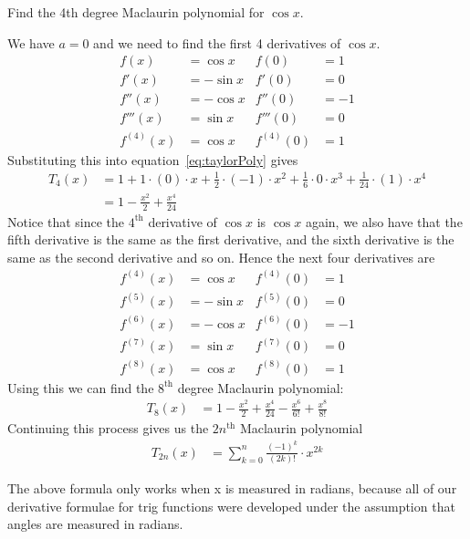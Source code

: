 \begin{eg}\label{eg expand cosx}
 Find the 4th degree Maclaurin polynomial for $\cos x$.

\soln We have $a=0$ and we need to find the first 4 derivatives of $\cos x$.
\begin{align*}
 f(x) &= \cos x & f(0) &= 1 \\
 f'(x) &= -\sin x & f'(0) &= 0 \\
 f''(x) &= -\cos x & f''(0) &= -1 \\
 f'''(x) &= \sin x & f'''(0) &= 0 \\
 f^{(4)}(x) &= \cos x & f^{(4)}(0) &= 1
\end{align*}
Substituting this into equation~\eqref{eq:taylorPoly} gives
\begin{align*}
  T_4(x)&= 1 + 1\cdot (0) \cdot x
  + \frac{1}{2} \cdot (-1) \cdot x^2
  + \frac{1}{6} \cdot 0 \cdot x^3
  + \frac{1}{24} \cdot (1) \cdot x^4 \\
  &= 1 - \frac{x^2}{2} + \frac{x^4}{24}
\end{align*}
Notice that since the $4^\mathrm{th}$ derivative of $\cos x$ is $\cos x$ again, we also
have that the fifth derivative is the same as the first derivative, and the sixth
derivative is the same as the second derivative and so on. Hence the next four
derivatives are
\begin{align*}
 f^{(4)}(x) &= \cos x & f^{(4)}(0) &= 1 \\
 f^{(5)}(x) &= -\sin x & f^{(5)}(0) &= 0 \\
 f^{(6)}(x) &= -\cos x & f^{(6)}(0) &= -1 \\
 f^{(7)}(x) &= \sin x & f^{(7)}(0) &= 0 \\
 f^{(8)}(x) &= \cos x & f^{(8)}(0) &= 1
\end{align*}
Using this we can find the $8^\mathrm{th}$ degree Maclaurin polynomial:
\begin{align*}
  T_8(x) &=
  1 - \frac{x^2}{2} + \frac{x^4}{24} -\frac{x^6}{6!} + \frac{x^8}{8!}
\end{align*}
Continuing this process gives us the $2n^\mathrm{th}$ Maclaurin polynomial
\begin{align*}
  T_{2n}(x) &= \sum_{k=0}^n \frac{(-1)^k}{(2k)!} \cdot x^{2k}
\end{align*}
\begin{warning}
The above formula only works when x is measured in radians, because all of our
derivative formulae for trig functions were developed under the assumption that
angles are measured in radians.
\end{warning}


\end{eg}

